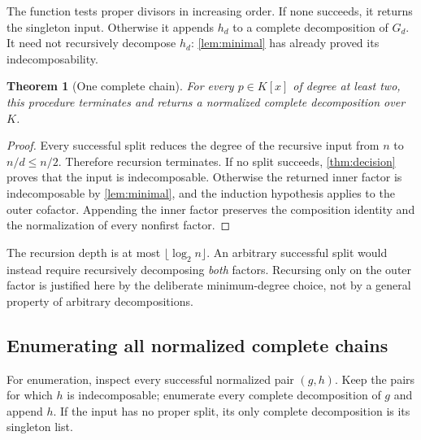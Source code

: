 \documentclass[11pt,a4paper]{article}
\newtheorem{theorem}{Theorem}[section]
\theoremstyle{definition}
\newcommand{\code}[1]{\texttt{\detokenize{#1}}}
\begin{document}
The function \code{AlgebraicDecompose} tests proper divisors in increasing order. If none succeeds, it returns the singleton input. Otherwise it appends $h_d$ to a complete decomposition of $G_d$. It need not recursively decompose $h_d$: \cref{lem:minimal} has already proved its indecomposability.

\begin{theorem}[One complete chain]\label{thm:one}
For every $p\in K[x]$ of degree at least two, this procedure terminates and returns a normalized complete decomposition over $K$.
\end{theorem}
\begin{proof}
Every successful split reduces the degree of the recursive input from $n$ to $n/d\le n/2$. Therefore recursion terminates. If no split succeeds, \cref{thm:decision} proves that the input is indecomposable. Otherwise the returned inner factor is indecomposable by \cref{lem:minimal}, and the induction hypothesis applies to the outer cofactor. Appending the inner factor preserves the composition identity and the normalization of every nonfirst factor.
\end{proof}

The recursion depth is at most $\lfloor\log_2 n\rfloor$. An arbitrary successful split would instead require recursively decomposing \emph{both} factors. Recursing only on the outer factor is justified here by the deliberate minimum-degree choice, not by a general property of arbitrary decompositions.

\subsection{Enumerating all normalized complete chains}
For enumeration, inspect every successful normalized pair $(g,h)$. Keep the pairs for which $h$ is indecomposable; enumerate every complete decomposition of $g$ and append $h$. If the input has no proper split, its only complete decomposition is its singleton list.
\end{document}
